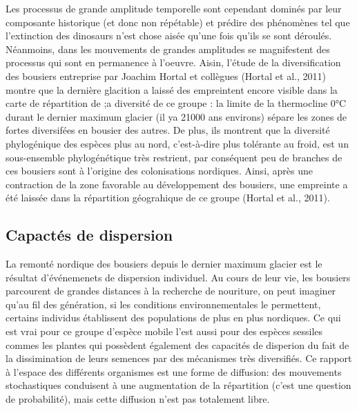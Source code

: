 Les processus de grande amplitude temporelle sont cependant dominés par
leur composante historique (et donc non répétable) et prédire des
phénomènes tel que l'extinction des dinosaurs n'est chose aisée qu'une
fois qu'ils se sont déroulés. Néanmoins, dans les mouvements de grandes
amplitudes se magnifestent des processus qui sont en permanence à
l'oeuvre. Aisin, l'étude de la diversification des bousiers entreprise
par Joachim Hortal et collègues (Hortal et al., 2011) montre que la
dernière glacition a laissé des empreintent encore visible dans la carte
de répartition de ;a diversité de ce groupe : la limite de la
thermocline 0°C durant le dernier maximum glacier (il ya 21000 ans
environs) sépare les zones de fortes diversifées en bousier des autres.
De plus, ils montrent que la diversité phylogénique des espèces plus au
nord, c'est-à-dire plus tolérante au froid, est un sous-ensemble
phylogénétique très restrient, par conséquent peu de branches de ces
bousiers sont à l'origine des colonisations nordiques. Ainsi, après une
contraction de la zone favorable au développement des bousiers, une
empreinte a été laissée dans la répartition géograhique de ce groupe
(Hortal et al., 2011).

\subsection*{Capactés de dispersion}\label{capactuxe9s-de-dispersion}

La remonté nordique des bousiers depuis le dernier maximum glacier est
le résultat d'événemenets de dispersion individuel. Au cours de leur
vie, les bousiers parcourent de grandes distances à la recherche de
nouriture, on peut imaginer qu'au fil des génération, si les conditions
environnementales le permettent, certains individus établissent des
populations de plus en plus nordiques. Ce qui est vrai pour ce groupe
d'espèce mobile l'est aussi pour des espèces sessiles commes les plantes
qui possèdent également des capacités de disperion du fait de la
dissimination de leurs semences par des mécanismes très diversifiés. Ce
rapport à l'espace des différents organismes est une forme de diffusion:
des mouvements stochastiques conduisent à une augmentation de la
répartition (c'est une question de probabilité), mais cette diffusion
n'est pas totalement libre.

